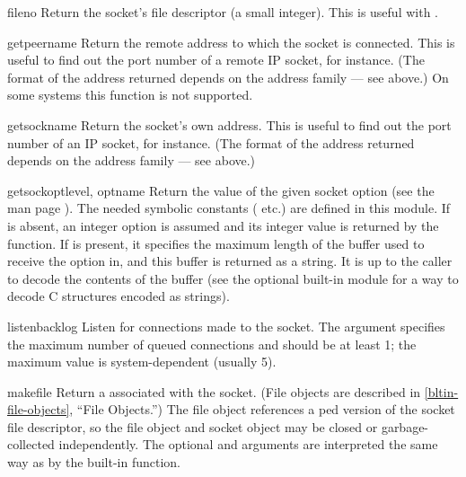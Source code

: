 \begin{methoddesc}[socket]{fileno}{}
Return the socket's file descriptor (a small integer).  This is useful
with .
\end{methoddesc}

\begin{methoddesc}[socket]{getpeername}{}
Return the remote address to which the socket is connected.  This is
useful to find out the port number of a remote IP socket, for instance.
(The format of the address returned depends on the address family ---
see above.)  On some systems this function is not supported.
\end{methoddesc}

\begin{methoddesc}[socket]{getsockname}{}
Return the socket's own address.  This is useful to find out the port
number of an IP socket, for instance.
(The format of the address returned depends on the address family ---
see above.)
\end{methoddesc}

\begin{methoddesc}[socket]{getsockopt}{level, optname}
Return the value of the given socket option (see the \UNIX{} man page
).  The needed symbolic constants
( etc.) are defined in this module.  If 
is absent, an integer option is assumed and its integer value
is returned by the function.  If  is present, it specifies
the maximum length of the buffer used to receive the option in, and
this buffer is returned as a string.  It is up to the caller to decode
the contents of the buffer (see the optional built-in module
 for a way to decode C structures encoded as strings).
\end{methoddesc}

\begin{methoddesc}[socket]{listen}{backlog}
Listen for connections made to the socket.  The  argument
specifies the maximum number of queued connections and should be at
least 1; the maximum value is system-dependent (usually 5).
\end{methoddesc}

\begin{methoddesc}[socket]{makefile}{}
Return a  associated with the socket.  (File objects
are described in \ref{bltin-file-objects}, ``File Objects.'')
The file object references a ped version of the
socket file descriptor, so the file object and socket object may be
closed or garbage-collected independently.
The optional 
and  arguments are interpreted the same way as by the
built-in  function.
\end{methoddesc}

